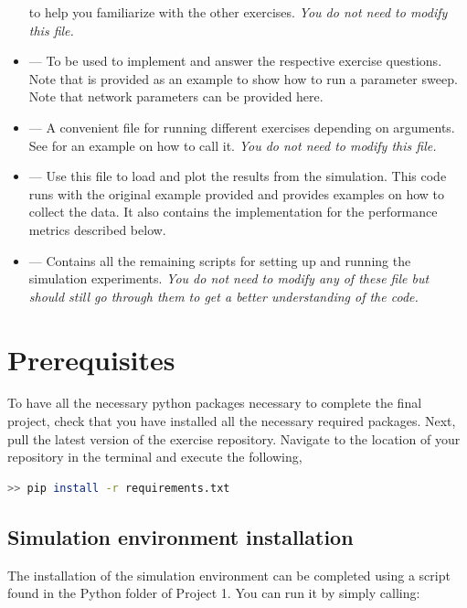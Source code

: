 \documentclass{cmc}
\begin{document}
\begin{itemize}
  to help you familiarize with the other exercises. \textit{You do not need to
    modify this file.}
\item {} --- To be used to implement and answer the
  respective exercise questions. Note that  is
  provided as an example to show how to run a parameter sweep. Note that network
  parameters can be provided here.
\item {} --- A convenient file for running different
  exercises depending on arguments. See  for an example
  on how to call it. \textit{You do not need to modify this file.}
\item {} --- Use this file to load and plot the
  results from the simulation. This code runs with the original example provided
  and provides examples on how to collect the data. It also contains the implementation
  for the performance metrics described below.
\item {} --- Contains all the remaining
  scripts for setting up and running the simulation experiments. \textit{You do
    not need to modify any of these file but should still go through them to get
    a better understanding of the code.}
\end{itemize}


\section*{Prerequisites}
To have all the necessary python packages necessary to complete the
final project, check that you have installed all the necessary required packages.
Next, pull the latest version of the exercise repository. Navigate to the
location of your repository in the terminal and execute the following,

\begin{lstlisting}[language=Bash]
  >> pip install -r requirements.txt
\end{lstlisting}


\subsection*{Simulation environment installation}

The installation of the simulation environment can be completed using a script
found in the Python folder of Project 1. You can run it by simply calling:
\end{document}
